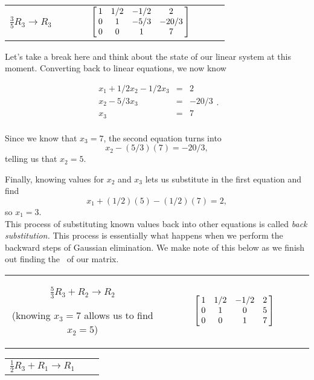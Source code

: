 {\begin{center}\begin{tabular}{ccl}
\parbox{70pt}{\centering\small $\frac35R_3\rightarrow R_3$\\}
&$\quad \quad$&
$\bmx{cccc}1&1/2&-1/2&2\\0&1&-5/3&-20/3\\0&0&1&7\\ \emx$
\end{tabular}\end{center}


Let's take a break here and think about the state of our linear system at this moment. Converting back to linear equations, we now know

$$\begin{array}{rcl}
x_1+1/2x_2-1/2x_3&=&2\\
x_2-5/3x_3&=&-20/3\\
x_3&=&7\\
\end{array}.$$

Since we know that $x_3 = 7$, the second equation turns into $$x_2 - (5/3)(7) = -20/3,$$ telling us that $x_2 = 5$.

Finally, knowing values for $x_2$ and $x_3$ lets us substitute in the first equation and find $$x_1 +(1/2)(5)-(1/2)(7) = 2,$$ so $x_1 = 3$.\\

This process of substituting known values back into other equations is called \textit{back substitution.} This process is essentially what happens when we perform the backward steps of Gaussian elimination. We make note of this below as we finish out finding the \rref\ of our matrix.

\begin{center}\begin{tabular}{ccl}
\parbox{100pt}{\centering\small $\frac53R_3+R_2\rightarrow R_2$\\

(knowing $x_3=7$ allows us to find $x_2 = 5$)}
&$\quad \quad$&
$\bmx{cccc}1&1/2&-1/2&2\\0&1&0&5\\0&0&1&7\\ \emx$
\end{tabular}\end{center}

\begin{center}\begin{tabular}{ccl}
\parbox{120pt}{\centering\small $\frac12R_3+R_1\rightarrow R_1$\\

}
\end{tabular}
\end{center}}
